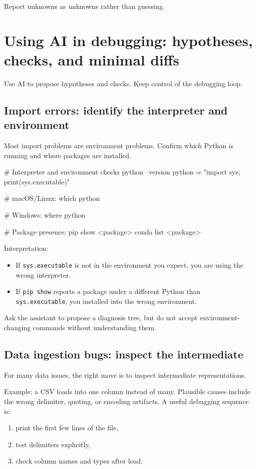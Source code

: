 Report unknowns as unknowns rather than guessing.

\section{Using AI in debugging: hypotheses, checks, and minimal diffs}
Use AI to propose hypotheses and checks. Keep control of the debugging loop.

\subsection{Import errors: identify the interpreter and environment}
Most import problems are environment problems. Confirm which Python is running and where packages are installed.

\begin{fullcode}
# Interpreter and environment checks
python --version
python -c "import sys; print(sys.executable)"

# macOS/Linux:
which python

# Windows:
where python

# Package presence:
pip show <package>
conda list <package>
\end{fullcode}

Interpretation:
\begin{itemize}[noitemsep]
  \item If \texttt{sys.executable} is not in the environment you expect, you are using the wrong interpreter.
  \item If \texttt{pip show} reports a package under a different Python than \texttt{sys.executable}, you installed into the wrong environment.
\end{itemize}

Ask the assistant to propose a diagnosis tree, but do not accept environment-changing commands without understanding them.

\subsection{Data ingestion bugs: inspect the intermediate}
For many data issues, the right move is to inspect intermediate representations.

Example: a CSV loads into one column instead of many. Plausible causes include the wrong delimiter, quoting, or encoding artifacts. A useful debugging sequence is:
\begin{enumerate}[noitemsep]
  \item print the first few lines of the file,
  \item test delimiters explicitly,
  \item check column names and types after load.
\end{enumerate}

